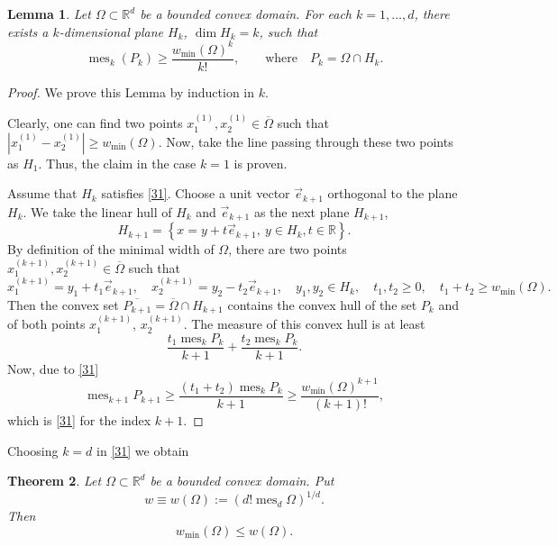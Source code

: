 \documentclass[a4paper,12pt]{article}
\numberwithin{equation}{section}
\def \O{\Omega}
\def \R{\mathbb{R}}
\def\mes{\operatorname{mes}}
\newcommand{\<}{\langle}
\renewcommand{\>}{\rangle}
\theoremstyle{plain}
\newtheorem{theorem}{\bf Theorem}[section]
\newtheorem{lemma}[theorem]{\bf Lemma}
\theoremstyle{definition}
\theoremstyle{remark}
\renewcommand{\le}{\leqslant}
\renewcommand{\ge}{\geqslant}
\begin{document}
\begin{lemma}
\label{l32}
Let $\O \subset \R^d$ be a bounded convex domain.
For each $k = 1, \dots, d$, there exists a $k$-dimensional plane $H_k$,
$\dim H_k = k$, such that
\begin{equation}
\label{31}
\mes_k (P_k) \ge \frac{w_{\min} (\O)^k}{k!},
\qquad \text{where}\quad P_k = \O \cap H_k.
\end{equation}
\end{lemma}

\begin{proof}
We prove this Lemma by induction in $k$.

Clearly, one can find two points $x_1^{(1)}, x_2^{(1)} \in \overline \O$
such that $|x_1^{(1)} - x_2^{(1)}| \ge w_{\min} (\O)$.
Now, take the line passing through these two points as $H_1$.
Thus, the claim in the case $k=1$ is proven.

Assume that $H_k$ satisfies \eqref{31}.
Choose a unit vector $\vec e_{k+1}$ orthogonal to the plane $H_k$.
We take the linear hull of $H_k$ and $\vec e_{k+1}$ as the next plane $H_{k+1}$,
$$
H_{k+1} = \left\{x = y + t \vec e_{k+1},\ y \in H_k, t \in \R\right\}.
$$
By definition of the minimal width of $\O$,
there are two points $x_1^{(k+1)}, x_2^{(k+1)} \in \overline \O$ such that
$$
x_1^{(k+1)} = y_1 + t_1 \vec e_{k+1}, \quad
x_2^{(k+1)} = y_2 - t_2 \vec e_{k+1}, \quad
y_1, y_2 \in H_k, \quad t_1, t_2 \ge 0, \quad t_1 + t_2 \ge w_{\min} (\O).
$$
Then the convex set $\overline{P_{k+1}} = \overline \O \cap H_{k+1}$
contains the convex hull of the set $P_k$ and of both points $x_1^{(k+1)}$, $x_2^{(k+1)}$.
The measure of this convex hull is at least
$$
\frac{t_1 \mes_k P_k}{k+1} + \frac{t_2 \mes_k P_k}{k+1}. 
$$
Now, due to \eqref{31}
$$
\mes_{k+1} P_{k+1} \ge \frac{(t_1+ t_2) \mes_k P_k}{k+1} 
\ge \frac{w_{\min} (\O)^{k+1}}{(k+1)!},
$$
which is \eqref{31} for the index $k+1$.
\end{proof}

Choosing $k=d$ in \eqref{31} we obtain

\begin{theorem}
\label{t33}
Let $\O \subset \R^d$ be a bounded convex domain.
Put
\begin{equation}
\label{32}
w \equiv w(\O) := \left(d! \mes_d \O\right)^{1/d}.
\end{equation}
Then
\begin{equation}
\label{33}
w_{\min} (\O) \le w (\O).
\end{equation}
\end{theorem}
\end{document}

